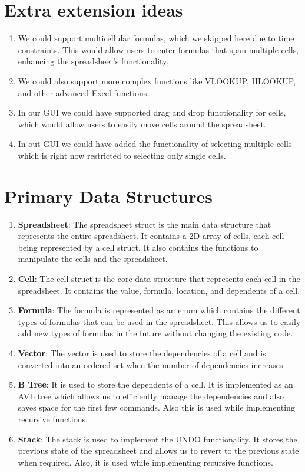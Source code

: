 \documentclass[10pt,a4paper]{article}  %
\begin{document}
\section{Extra extension ideas}
\begin{enumerate}
    \item We could support multicellular formulas, which we skipped here due to time constraints. This would allow users to enter formulas that span multiple cells, enhancing the spreadsheet's functionality.
    \item We could also support more complex functions like VLOOKUP, HLOOKUP, and other advanced Excel functions.
    \item In our GUI we could have supported drag and drop functionality for cells, which would allow users to easily move cells around the spreadsheet.
    \item In out GUI we could have added the functionality of selecting multiple cells which is right now restricted to selecting only single cells.
\end{enumerate}
\section{Primary Data Structures}
\begin{enumerate}
    \item \textbf{Spreadsheet}: The spreadsheet struct is the main data structure that represents the entire spreadsheet. It contains a 2D array of cells, each cell being represented by a cell struct. It also contains the functions to manipulate the cells and the spreadsheet.
    \item \textbf{Cell}: The cell struct is the core data structure that represents each cell in the spreadsheet. It contains the value, formula, location, and dependents of a cell.
    \item \textbf{Formula}: The formula is represented as an enum which contains the different types of formulas that can be used in the spreadsheet. This allows us to easily add new types of formulas in the future without changing the existing code.
    \item \textbf{Vector}: The vector is used to store the dependencies of a cell and is converted into an ordered set when the number of dependencies increases.
    \item \textbf{B Tree}: It is used to store the dependents of a cell. It is implemented as an AVL tree which allows us to efficiently manage the dependencies and also saves space for the first few commands. Also this is used while implementing recursive functions.
    \item \textbf{Stack}: The stack is used to implement the UNDO functionality. It stores the previous state of the spreadsheet and allows us to revert to the previous state when required. Also, it is used while implementing recursive functions.
\end{enumerate}
\end{document}

